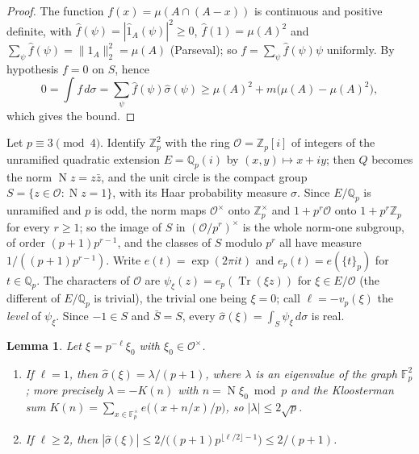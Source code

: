 \documentclass[11pt,a4paper]{amsart}
\newtheorem{lemma}[theorem]{Lemma}
\theoremstyle{remark}
\newcommand{\F}{\mathbb{F}}
\newcommand{\Q}{\mathbb{Q}}
\newcommand{\Z}{\mathbb{Z}}
\newcommand{\Oo}{\mathcal{O}}
\newcommand{\Tr}{\operatorname{Tr}}
\newcommand{\N}{\operatorname{N}}
\begin{document}
\begin{proof}
The function $f(x)=\mu(A\cap(A-x))$ is continuous and positive definite, with $\hat f(\psi)=|\hat 1_A(\psi)|^2\ge0$,
$\hat f(1)=\mu(A)^2$ and $\sum_\psi\hat f(\psi)=\|1_A\|_2^2=\mu(A)$ (Parseval); so $f=\sum_\psi\hat f(\psi)\psi$
uniformly. By hypothesis $f=0$ on $S$, hence
\[
0=\int f\,d\sigma=\sum_\psi\hat f(\psi)\hat\sigma(\psi)\ge\mu(A)^2+m\bigl(\mu(A)-\mu(A)^2\bigr),
\]
which gives the bound.
\end{proof}

Let $p\equiv3\pmod4$. Identify $\Z_p^2$ with the ring $\Oo=\Z_p[i]$ of integers of the unramified quadratic
extension $E=\Q_p(i)$ by $(x,y)\mapsto x+iy$; then $Q$ becomes the norm $\N z=z\bar z$, and the unit circle is the
compact group $S=\{z\in\Oo:\N z=1\}$, with its Haar probability measure $\sigma$. Since $E/\Q_p$ is unramified and
$p$ is odd, the norm maps $\Oo^\times$ onto $\Z_p^\times$ and $1+p^r\Oo$ onto $1+p^r\Z_p$ for every $r\ge1$; so
the image of $S$ in $(\Oo/p^r)^\times$ is the whole norm-one subgroup, of order $(p+1)p^{r-1}$, and the classes of
$S$ modulo $p^r$ all have measure $1/((p+1)p^{r-1})$. Write $e(t)=\exp(2\pi it)$ and $e_p(t)=e(\{t\}_p)$ for
$t\in\Q_p$. The characters of $\Oo$ are $\psi_\xi(z)=e_p(\Tr(\xi z))$ for $\xi\in E/\Oo$ (the different of $E/\Q_p$
is trivial), the trivial one being $\xi=0$; call $\ell=-v_p(\xi)$ the \emph{level} of $\psi_\xi$. Since $-1\in S$
and $\bar S=S$, every $\hat\sigma(\xi)=\int_S\psi_\xi\,d\sigma$ is real.

\begin{lemma}\label{lem:levels}
Let $\xi=p^{-\ell}\xi_0$ with $\xi_0\in\Oo^\times$.
\begin{enumerate}
\item If $\ell=1$, then $\hat\sigma(\xi)=\lambda/(p+1)$, where $\lambda$ is an eigenvalue of the graph
$\F_p^2$; more precisely $\lambda=-K(n)$ with $n=\N\xi_0\bmod p$ and the Kloosterman sum
$K(n)=\sum_{x\in\F_p^\times}e\bigl((x+n/x)/p\bigr)$, so $|\lambda|\le2\sqrt p$.
\item If $\ell\ge2$, then $|\hat\sigma(\xi)|\le 2/\bigl((p+1)p^{\lfloor\ell/2\rfloor-1}\bigr)\le2/(p+1)$.
\end{enumerate}
\end{lemma}
\end{document}
